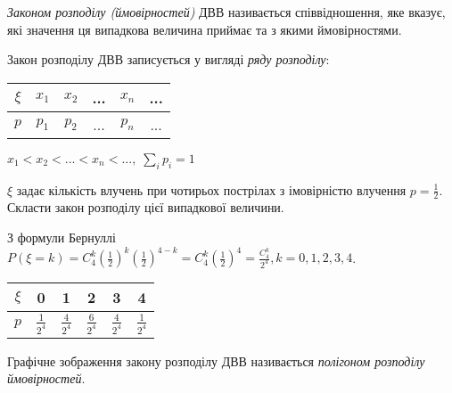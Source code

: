 \begin{definition}
    \emph{Законом розподілу (ймовірностей)} ДВВ називається співвідношення, яке вказує, 
    які значення ця випадкова величина приймає та з якими ймовірностями.

    Закон розподілу ДВВ записується у вигляді \emph{ряду розподілу}:

    \begin{tabular}{c|c|c|c|c|c}
        $\xi$ & $x_1$ & $x_2$ & ... & $x_n$ & ... \\
        \hline
        $p$ & $p_1$ & $p_2$ & ... & $p_n$ & ...
    \end{tabular}
    \hspace{40pt}
    $x_1 < x_2 < ... < x_n < ...,\; \sum\limits_i p_i = 1$
\end{definition}
\begin{example}
    $\xi$ задає кількість влучень при чотирьох пострілах з імовірністю влучення 
    $p = \frac{1}{2}$. Скласти закон розподілу цієї випадкової величини.

    З формули Бернуллі $P(\xi = k) = C_4^k \left(\frac{1}{2}\right)^k \left(\frac{1}{2}\right)^{4-k} = 
    C_4^k \left(\frac{1}{2}\right)^4 = \frac{C_4^k}{2^4}, k = 0,1,2,3,4$.

    \begin{tabular}{c|c|c|c|c|c}
        $\xi$ & 0 & 1 & 2 & 3 & 4 \\
        \hline
        $p$ & $\frac{1}{2^4}$ & $\frac{4}{2^4}$ & $\frac{6}{2^4}$ & $\frac{4}{2^4}$ & 
        $\frac{1}{2^4}$
    \end{tabular}
\end{example}
\begin{definition}
    Графічне зображення закону розподілу ДВВ називається 
    \emph{полігоном розподілу ймовірностей}.
\end{definition}

